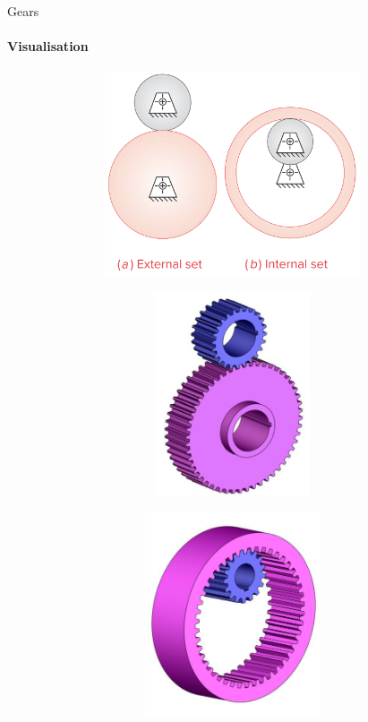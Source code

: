 \documentclass[aspectratio=169]{beamer}
\begin{document}
\begin{frame}[t]{Gears}
    \framesubtitle{Visualisation}
    \vspace{-0.6cm}
    \begin{figure}[H]
        \begin{subfigure}[c]{0.32\textwidth}
            \centering\includegraphics[height=6cm,width=1\textwidth,keepaspectratio]{friction_kinematics.png}
        \end{subfigure}
        \begin{subfigure}[c]{0.32\textwidth}
            \centering\includegraphics[height=6cm,width=1\textwidth,keepaspectratio]{gear_1.png}
            \label{fig:gear_1.png}
        \end{subfigure}
        \begin{subfigure}[c]{0.32\textwidth}
            \centering\includegraphics[height=6cm,width=1\textwidth,keepaspectratio]{gear_2.png}
            \label{fig:gear_2.png}
        \end{subfigure}
    \end{figure}
\end{frame}
\end{document}
